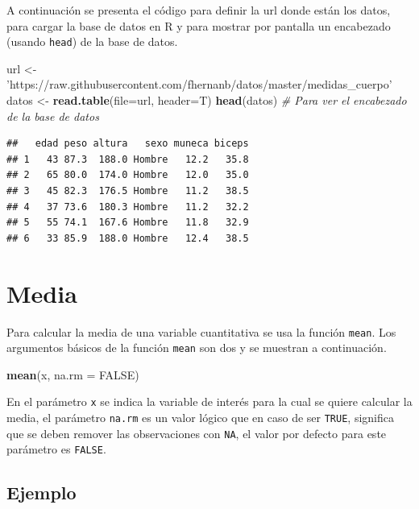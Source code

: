 \documentclass[10pt,]{krantz}
\makeatletter
\newenvironment{Shaded}{\begin{snugshade}}{\end{snugshade}}
\newcommand{\KeywordTok}[1]{\textcolor[rgb]{0.13,0.29,0.53}{\textbf{{#1}}}}
\newcommand{\DataTypeTok}[1]{\textcolor[rgb]{0.13,0.29,0.53}{{#1}}}
\newcommand{\StringTok}[1]{\textcolor[rgb]{0.31,0.60,0.02}{{#1}}}
\newcommand{\CommentTok}[1]{\textcolor[rgb]{0.56,0.35,0.01}{\textit{{#1}}}}
\newcommand{\OtherTok}[1]{\textcolor[rgb]{0.56,0.35,0.01}{{#1}}}
\newcommand{\NormalTok}[1]{{#1}}
\newenvironment{kframe}{%
\medskip{}
\setlength{\fboxsep}{.8em}
 \def\at@end@of@kframe{}%
 \ifinner\ifhmode%
  \def\at@end@of@kframe{\end{minipage}}%
  \begin{minipage}{\columnwidth}%
 \fi\fi%
 \def\FrameCommand##1{\hskip\@totalleftmargin \hskip-\fboxsep
 \colorbox{shadecolor}{##1}\hskip-\fboxsep
     \hskip-\linewidth \hskip-\@totalleftmargin \hskip\columnwidth}%
 \MakeFramed {\advance\hsize-\width
   \@totalleftmargin\z@ \linewidth\hsize
   \@setminipage}}%
 {\par\unskip\endMakeFramed%
 \at@end@of@kframe}
\renewenvironment{Shaded}{\begin{kframe}}{\end{kframe}}
\makeatother
\begin{document}
A continuación se presenta el código para definir la url donde están los
datos, para cargar la base de datos en R y para mostrar por pantalla un
encabezado (usando \texttt{head}) de la base de datos.

\begin{Shaded}
\begin{Highlighting}[]
\NormalTok{url <-}\StringTok{ 'https://raw.githubusercontent.com/fhernanb/datos/master/medidas_cuerpo'}
\NormalTok{datos <-}\StringTok{ }\KeywordTok{read.table}\NormalTok{(}\DataTypeTok{file=}\NormalTok{url, }\DataTypeTok{header=}\NormalTok{T)}
\KeywordTok{head}\NormalTok{(datos)  }\CommentTok{# Para ver el encabezado de la base de datos}
\end{Highlighting}
\end{Shaded}

\begin{verbatim}
##   edad peso altura   sexo muneca biceps
## 1   43 87.3  188.0 Hombre   12.2   35.8
## 2   65 80.0  174.0 Hombre   12.0   35.0
## 3   45 82.3  176.5 Hombre   11.2   38.5
## 4   37 73.6  180.3 Hombre   11.2   32.2
## 5   55 74.1  167.6 Hombre   11.8   32.9
## 6   33 85.9  188.0 Hombre   12.4   38.5
\end{verbatim}

\section{\texorpdfstring{Media 
}{Media  }}\label{media}

Para calcular la media de una variable cuantitativa se usa la función
\texttt{mean}. Los argumentos básicos de la función \texttt{mean} son
dos y se muestran a continuación.

\begin{Shaded}
\begin{Highlighting}[]
\KeywordTok{mean}\NormalTok{(x, }\DataTypeTok{na.rm =} \OtherTok{FALSE}\NormalTok{)}
\end{Highlighting}
\end{Shaded}

En el parámetro \texttt{x} se indica la variable de interés para la cual
se quiere calcular la media, el parámetro \texttt{na.rm} es un valor
lógico que en caso de ser \texttt{TRUE}, significa que se deben remover
las observaciones con \texttt{NA}, el valor por defecto para este
parámetro es \texttt{FALSE}.

\subsection*{Ejemplo}\label{ejemplo-30}
\end{document}

